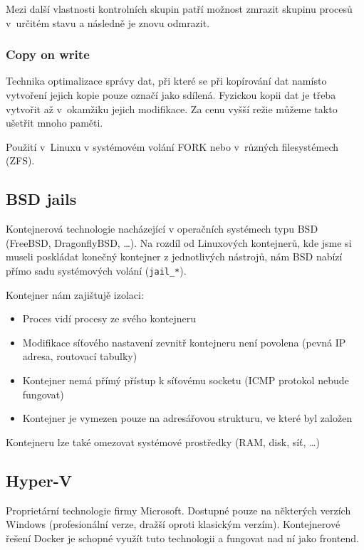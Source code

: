 Mezi další vlastnosti kontrolních skupin patří možnost zmrazit skupinu procesů v~určitém stavu a následně je znovu odmrazit. %


\subsubsection{Copy on write}

Technika optimalizace správy dat, při které se při kopírování dat namísto vytvoření jejich kopie pouze označí jako sdílená.
Fyzickou kopii dat je třeba vytvořit až v~okamžiku jejich modifikace.
Za cenu vyšší režie můžeme takto ušetřit mnoho paměti.


Použití v~Linuxu v systémovém volání FORK nebo v~různých filesystémech (ZFS).

\subsection{BSD jails}

Kontejnerová technologie nacházející v operačních systémech typu BSD (FreeBSD, DragonflyBSD, \ldots).
Na rozdíl od Linuxových kontejnerů, kde jsme si museli poskládat konečný kontejner z jednotlivých nástrojů, nám BSD nabízí přímo sadu systémových volání (\verb|jail_*|).

Kontejner nám zajištujě izolaci:
\begin{itemize}
	\item Proces vidí procesy ze svého kontejneru
	\item Modifikace síťového nastavení zevnitř kontejneru není povolena (pevná IP adresa, routovací tabulky)
	\item Kontejner nemá přímý přístup k síťovému socketu (ICMP protokol nebude fungovat)
	\item Kontejner je vymezen pouze na adresářovou strukturu, ve které byl založen
\end{itemize}

Kontejneru lze také omezovat systémové prostředky (RAM, disk, síť, \ldots)



\subsection{Hyper-V}

Proprietární technologie firmy Microsoft.
Dostupné pouze na některých verzích Windows (profesionální verze, dražší oproti klasickým verzím).
Kontejnerové řešení Docker je schopné využít tuto technologii a fungovat nad ní jako frontend.
